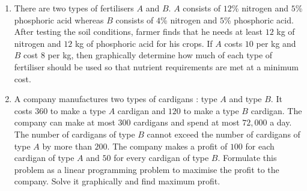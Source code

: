 \begin{enumerate}
    \item There are two types of fertilisers $A$ and $B$. $A$ consists of $12$\% nitrogen and $5$\% phosphoric acid whereas $B$ consists of $4$\% nitrogen and $5$\% phosphoric acid. After testing the soil conditions, farmer finds that he needs at least $12$ kg of nitrogen and $12$ kg of phosphoric acid for his crops. If $A$ costs \rupee $10$ per kg and $B$ cost \rupee $8$ per kg, then graphically determine how much of each type of fertiliser should be used so that nutrient requirements are met at a minimum cost.
    \item A company manufactures two types of cardigans : type $A$ and type $B$. It costs \rupee $360$ to make a type $A$ cardigan and \rupee $120$ to make a type $B$ cardigan. The company can make at most $300$ cardigans and spend at most \rupee $72,000$ a day. The number of cardigans of type $B$ cannot exceed the number of cardigans of type $A$ by more than $200$. The company makes a profit of \rupee $100$ for each cardigan of type $A$ and \rupee $50$ for every cardigan of type $B$. Formulate this problem as a linear programming problem to maximise the profit to the company. Solve it graphically and find maximum profit.
\end{enumerate}